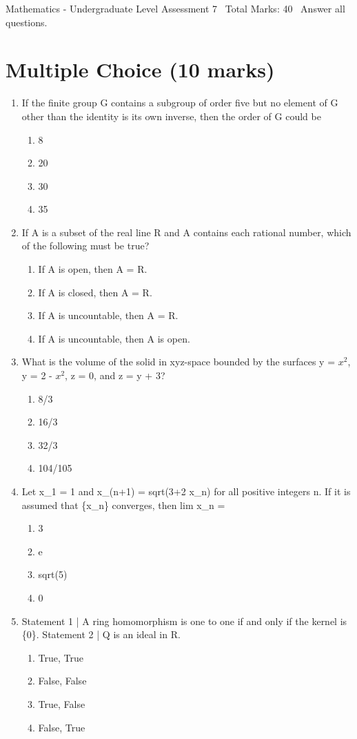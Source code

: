 \documentclass[12pt]{article}
\begin{document}
\begin{center}
Mathematics - Undergraduate Level Assessment 7 \
Total Marks: 40 \
Answer all questions.
\end{center}

\section*{Multiple Choice (10 marks)}
\begin{enumerate}[label=\arabic*.]
\item If the finite group G contains a subgroup of order five but no element of G other than the identity is its own inverse, then the order of G could be
\begin{enumerate}[label=(\alph*)]
    \item 8
    \item 20
    \item 30
    \item 35
\end{enumerate}
\item If A is a subset of the real line R and A contains each rational number, which of the following must be true?
\begin{enumerate}[label=(\alph*)]
    \item If A is open, then A = R.
    \item If A is closed, then A = R.
    \item If A is uncountable, then A = R.
    \item If A is uncountable, then A is open.
\end{enumerate}
\item What is the volume of the solid in xyz-space bounded by the surfaces y = $x^2$, y = 2 - $x^2$, z = 0, and z = y + 3?
\begin{enumerate}[label=(\alph*)]
    \item 8/3
    \item 16/3
    \item 32/3
    \item 104/105
\end{enumerate}
\item Let x\_1 = 1 and x\_(n+1) = sqrt(3+2 x\_n) for all positive integers n. If it is assumed that \{x\_n\} converges, then lim x\_n =
\begin{enumerate}[label=(\alph*)]
    \item 3
    \item e
    \item sqrt(5)
    \item 0
\end{enumerate}
\item Statement 1 | A ring homomorphism is one to one if and only if the kernel is \{0\}. Statement 2 | Q is an ideal in R.
\begin{enumerate}[label=(\alph*)]
    \item True, True
    \item False, False
    \item True, False
    \item False, True
\end{enumerate}
\end{enumerate}
\end{document}
